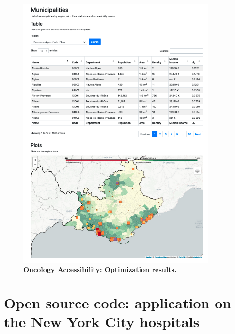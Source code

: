 \begin{figure}[H]
    \includegraphics[width=0.9\textwidth]{images/oncology-accessibility/municipalities-paca.png}
    \centering
    \caption{
        \textbf{Oncology Accessibility: Optimization results.}
    }
    \label{fig:optim-municipalities}
\end{figure}

\section{Open source code: application on the New York City hospitals}

